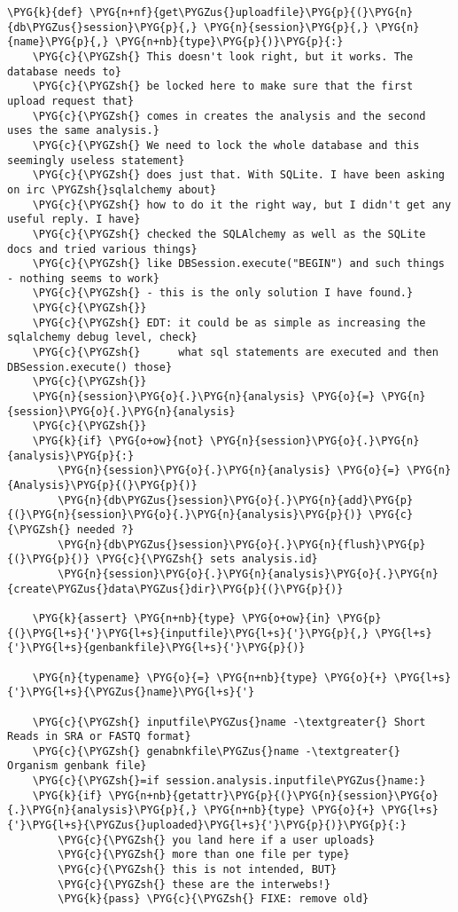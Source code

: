 \begin{Verbatim}[commandchars=\\\{\}]
\PYG{k}{def} \PYG{n+nf}{get\PYGZus{}uploadfile}\PYG{p}{(}\PYG{n}{db\PYGZus{}session}\PYG{p}{,} \PYG{n}{session}\PYG{p}{,} \PYG{n}{name}\PYG{p}{,} \PYG{n+nb}{type}\PYG{p}{)}\PYG{p}{:}
    \PYG{c}{\PYGZsh{} This doesn't look right, but it works. The database needs to}
    \PYG{c}{\PYGZsh{} be locked here to make sure that the first upload request that}
    \PYG{c}{\PYGZsh{} comes in creates the analysis and the second uses the same analysis.}
    \PYG{c}{\PYGZsh{} We need to lock the whole database and this seemingly useless statement}
    \PYG{c}{\PYGZsh{} does just that. With SQLite. I have been asking on irc \PYGZsh{}sqlalchemy about}
    \PYG{c}{\PYGZsh{} how to do it the right way, but I didn't get any useful reply. I have}
    \PYG{c}{\PYGZsh{} checked the SQLAlchemy as well as the SQLite docs and tried various things}
    \PYG{c}{\PYGZsh{} like DBSession.execute("BEGIN") and such things - nothing seems to work}
    \PYG{c}{\PYGZsh{} - this is the only solution I have found.}
    \PYG{c}{\PYGZsh{}}
    \PYG{c}{\PYGZsh{} EDT: it could be as simple as increasing the sqlalchemy debug level, check}
    \PYG{c}{\PYGZsh{}      what sql statements are executed and then DBSession.execute() those}
    \PYG{c}{\PYGZsh{}}
    \PYG{n}{session}\PYG{o}{.}\PYG{n}{analysis} \PYG{o}{=} \PYG{n}{session}\PYG{o}{.}\PYG{n}{analysis}
    \PYG{c}{\PYGZsh{}}
    \PYG{k}{if} \PYG{o+ow}{not} \PYG{n}{session}\PYG{o}{.}\PYG{n}{analysis}\PYG{p}{:}
        \PYG{n}{session}\PYG{o}{.}\PYG{n}{analysis} \PYG{o}{=} \PYG{n}{Analysis}\PYG{p}{(}\PYG{p}{)}
        \PYG{n}{db\PYGZus{}session}\PYG{o}{.}\PYG{n}{add}\PYG{p}{(}\PYG{n}{session}\PYG{o}{.}\PYG{n}{analysis}\PYG{p}{)} \PYG{c}{\PYGZsh{} needed ?}
        \PYG{n}{db\PYGZus{}session}\PYG{o}{.}\PYG{n}{flush}\PYG{p}{(}\PYG{p}{)} \PYG{c}{\PYGZsh{} sets analysis.id}
        \PYG{n}{session}\PYG{o}{.}\PYG{n}{analysis}\PYG{o}{.}\PYG{n}{create\PYGZus{}data\PYGZus{}dir}\PYG{p}{(}\PYG{p}{)}

    \PYG{k}{assert} \PYG{n+nb}{type} \PYG{o+ow}{in} \PYG{p}{(}\PYG{l+s}{'}\PYG{l+s}{inputfile}\PYG{l+s}{'}\PYG{p}{,} \PYG{l+s}{'}\PYG{l+s}{genbankfile}\PYG{l+s}{'}\PYG{p}{)}

    \PYG{n}{typename} \PYG{o}{=} \PYG{n+nb}{type} \PYG{o}{+} \PYG{l+s}{'}\PYG{l+s}{\PYGZus{}name}\PYG{l+s}{'}

    \PYG{c}{\PYGZsh{} inputfile\PYGZus{}name -\textgreater{} Short Reads in SRA or FASTQ format}
    \PYG{c}{\PYGZsh{} genabnkfile\PYGZus{}name -\textgreater{} Organism genbank file}
    \PYG{c}{\PYGZsh{}=if session.analysis.inputfile\PYGZus{}name:}
    \PYG{k}{if} \PYG{n+nb}{getattr}\PYG{p}{(}\PYG{n}{session}\PYG{o}{.}\PYG{n}{analysis}\PYG{p}{,} \PYG{n+nb}{type} \PYG{o}{+} \PYG{l+s}{'}\PYG{l+s}{\PYGZus{}uploaded}\PYG{l+s}{'}\PYG{p}{)}\PYG{p}{:}
        \PYG{c}{\PYGZsh{} you land here if a user uploads}
        \PYG{c}{\PYGZsh{} more than one file per type}
        \PYG{c}{\PYGZsh{} this is not intended, BUT}
        \PYG{c}{\PYGZsh{} these are the interwebs!}
        \PYG{k}{pass} \PYG{c}{\PYGZsh{} FIXE: remove old}


\end{Verbatim}
